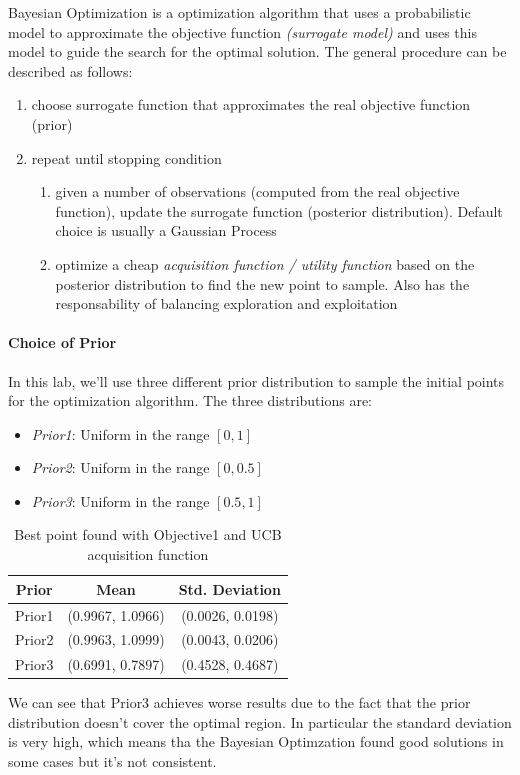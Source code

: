 Bayesian Optimization is a optimization algorithm that uses a probabilistic model to approximate the objective function \textit{(surrogate model)} and uses this model to guide the search for the optimal solution. The general procedure can be described as follows:
\begin{enumerate}
    \item choose surrogate function that approximates the real objective function (prior)
    \item repeat until stopping condition
          \begin{enumerate}
              \item given a number of observations (computed from the real objective function), update the surrogate function (posterior distribution). Default choice is usually a Gaussian Process
              \item optimize a cheap \textit{acquisition function / utility function} based on the posterior distribution to find the new point to sample. Also has the responsability of balancing exploration and exploitation
          \end{enumerate}
\end{enumerate}

\paragraph*{Choice of Prior}
In this lab, we'll use three different prior distribution to sample the initial points for the optimization algorithm. The three distributions are:
\begin{itemize}
    \item \textit{Prior1}: Uniform in the range $[0, 1]$
    \item \textit{Prior2}: Uniform in the range $[0, 0.5]$
    \item \textit{Prior3}: Uniform in the range $[0.5, 1]$
\end{itemize}
\begin{table}[H]
    \centering
    \begin{tabular}{|c|c|c|}
        \textbf{Prior} & \textbf{Mean}    & \textbf{Std. Deviation} \\\hline
        Prior1         & (0.9967, 1.0966) & (0.0026, 0.0198)        \\
        Prior2         & (0.9963, 1.0999) & (0.0043, 0.0206)        \\
        Prior3         & (0.6991, 0.7897) & (0.4528, 0.4687)        \\
        \hline
    \end{tabular}
    \caption{Best point found with Objective1 and UCB acquisition function}
    \label{tab:prior}
\end{table}
We can see that Prior3 achieves worse results due to the fact that the prior distribution doesn't cover the optimal region. In particular the standard deviation is very high, which means tha the Bayesian Optimzation found good solutions in some cases but it's not consistent.

